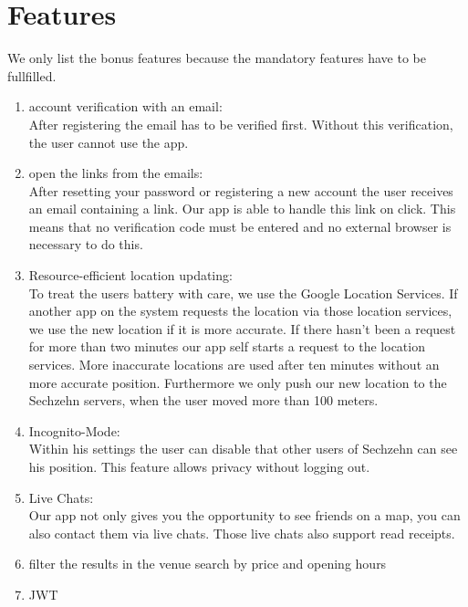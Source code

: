 \documentclass[11pt, accentcolor=tud1c]{tudreport}
\begin{document}
\section{Features}
We only list the bonus features because the mandatory features have to be fullfilled.
\begin{enumerate}
\item account verification with an email: \\
After registering the email has to be verified first. Without this verification, the user cannot use the app.
\item open the links from the emails: \\
After resetting your password or registering a new account the user receives an email containing a link. Our app is able to handle this link on click. This means that no verification code must be entered and no external browser is necessary to do this.
\item Resource-efficient location updating: \\
To treat the users battery with care, we use the Google Location Services. If another app on the system requests the location via those location services, we use the new location if it is more accurate. If there hasn't been a request for more than two minutes our app self starts a request to the location services. More inaccurate locations are used after ten minutes without an more accurate position. Furthermore we only push our new location to the Sechzehn servers, when the user moved more than 100 meters. 
\item Incognito-Mode: \\
Within his settings the user can disable that other users of Sechzehn can see his position. This feature allows privacy without logging out.
\item Live Chats: \\
Our app not only gives you the opportunity to see friends on a map, you can also contact them via live chats. Those live chats also support read receipts.
\item filter the results in the venue search by price and opening hours
\item JWT
\end{enumerate}
\end{document}
